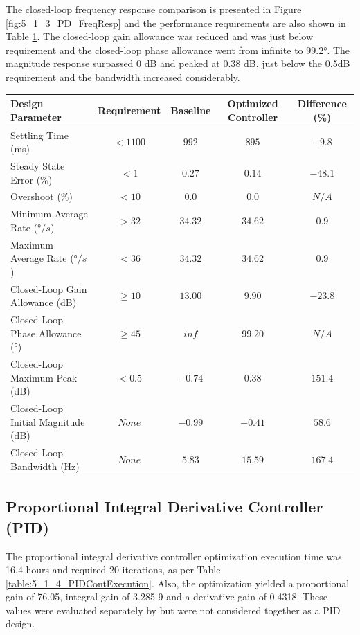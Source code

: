 The closed-loop frequency response comparison is presented in Figure \ref{fig:5_1_3_PD_FreqResp} and the performance requirements are also shown in Table \ref{table:5_1_3_PD_PerfTable}. The closed-loop gain allowance was reduced and was just below requirement and the closed-loop phase allowance went from infinite to 99.2$°$. The magnitude response surpassed 0 dB and peaked at 0.38 dB, just below the 0.5dB requirement and the bandwidth increased considerably.

\begin{table}[H]
	\label{table:5_1_3_PD_PerfTable}
	\centering
	\resizebox{14cm}{!} {
		\begin{tabular}{|l|c|c|c|c|}
			\hline
			Design Parameter & Requirement & Baseline & Optimized Controller & Difference (\%) \\ \hline
			Settling Time (ms) & $< 1100 $ & $992$ & $895$ & $-9.8$ \\ \hline
			Steady State Error ($\%$) & $< 1$ & $0.27$ & $0.14$ & $-48.1$ \\ \hline
			Overshoot ($\%$) & $< 10 $  & $0.0$ & $0.0$ & $N/A$ \\ \hline
			Minimum Average Rate ($°/s$) & $> 32$ & $34.32$ & $34.62$ & $0.9$ \\ \hline
			Maximum Average Rate ($°/s$) & $< 36$ & $34.32$ & $34.62$ & $0.9$ \\ \hline
			Closed-Loop Gain Allowance (dB) & $ \geq 10 $ & $13.00$ & $9.90$ & $-23.8$ \\ \hline
			Closed-Loop Phase Allowance ($°$) & $ \geq 45$ & $inf$ & $99.20$ & $N/A$ \\ \hline
			Closed-Loop Maximum Peak (dB) & $ < 0.5$ & $-0.74$ & $0.38$ & $151.4$ \\ \hline
			Closed-Loop Initial Magnitude (dB) & $None$ & $-0.99$ & $-0.41$ & $58.6$ \\ \hline
			Closed-Loop Bandwidth (Hz) & $None$ & $5.83$ & $15.59$ & $167.4$ \\ \hline
	\end{tabular}}
\end{table}

\subsection{Proportional  Integral Derivative Controller (PID)}

The proportional integral derivative controller optimization execution time was 16.4 hours and required 20 iterations, as per Table \ref{table:5_1_4_PIDContExecution}. Also, the optimization yielded a proportional gain of 76.05, integral gain of 3.285-9 and a derivative gain of 0.4318. These values were evaluated separately by  but were not considered together as a PID design.

